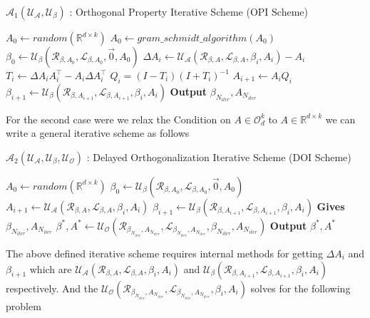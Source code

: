 \begin{algorithm}[H]
\caption{$\mathcal{A}_{1}(\mathcal{U_{A}},\mathcal{U_{\beta}})$ : Orthogonal Property Iterative Scheme (OPI Scheme)}\label{lfm_orthogonal_property_iterative_scheme}
\begin{algorithmic}[1]
\State $A_{0} \gets random(\mathbb{R}^{d\times k}) $
\State $A_{0} \gets gram\_schmidt\_algorithm(A_0)$
\State $\beta_0 \gets \mathcal{U_{\beta}}(\mathcal{R}_{\beta, A_0},\mathcal{L}_{\beta, A_0},\Vec{0},A_{0})$
    \State $ \Delta A_i \gets \mathcal{U_{A}}(\mathcal{R}_{\beta, A},\mathcal{L}_{\beta, A},\beta_i,A_i)-A_i$
    \State $T_i \gets  \Delta A_iA_i^\top- A_i\Delta A_i^\top$
    \State $Q_i = (I-T_i)(I+T_i)^{-1}$
    \State $A_{i+1} \gets A_iQ_i$
    \State $\beta_{i+1} \gets \mathcal{U_{\beta}}(\mathcal{R}_{\beta, A_{i+1}},\mathcal{L}_{\beta, A_{i+1}},\beta_{i}, A_{i})$
\EndFor
\State \textbf{Output} $\beta_{N_{iter}},A_{N_{iter}}$
\end{algorithmic}
\end{algorithm} For the second case were we relax the Condition on $A \in \mathcal{O}_d^k$ to $A \in \mathbb{R}^{d\times k}$ we can write a general iterative scheme as follows
\begin{algorithm}[H]
\caption{$\mathcal{A}_{2}(\mathcal{U_{A}},\mathcal{U_{\beta}}, \mathcal{U_{O}})$ : Delayed Orthogonalization Iterative Scheme (DOI Scheme)}\label{lfm_orthogonal_property_iterative_scheme}
\begin{algorithmic}[1]
\State $A_{0} \gets random(\mathbb{R}^{d\times k}) $
\State $\beta_0 \gets \mathcal{U_{\beta}}(\mathcal{R}_{\beta, A_0},\mathcal{L}_{\beta, A_0},\Vec{0},A_{0})$
    \State $A_{i+1} \gets  \mathcal{U_{A}}(\mathcal{R}_{\beta, A},\mathcal{L}_{\beta, A},\beta_i,A_i)$
    \State $\beta_{i+1} \gets \mathcal{U_{\beta}}(\mathcal{R}_{\beta, A_{i+1}},\mathcal{L}_{\beta, A_{i+1}},\beta_{i}, A_{i})$
\EndFor
\State \textbf{Gives} $\beta_{N_{iter}},A_{N_{iter}}$
\State $\beta^{*}, A^{*} \gets \mathcal{U_{O}}(\mathcal{R}_{\beta_{N_{iter}}, A_{N_{iter}}},\mathcal{L}_{\beta_{N_{iter}}, A_{N_{iter}}},\beta_{N_{iter}}, A_{N_{iter}})$
\State \textbf{Output} $\beta^{*},A^{*}$
\end{algorithmic}
\end{algorithm} \hspace{0mm} \newline The above defined iterative scheme requires internal methods for getting $\Delta A_i$ and $\beta_{i+1}$ which are $\mathcal{U_{A}}(\mathcal{R}_{\beta, A},\mathcal{L}_{\beta, A},\beta_i,A_i)$ and $\mathcal{U_{\beta}}(\mathcal{R}_{\beta, A_{i+1}},\mathcal{L}_{\beta, A_{i+1}},\beta_i,A_i)$ respectively. And the $\mathcal{U_{O}}(\mathcal{R}_{\beta_{N_{iter}}, A_{N_{iter}}},\mathcal{L}_{\beta_{N_{iter}}, A_{N_{iter}}},\beta_i,A_i)$ solves for the following problem \hspace{2mm}
